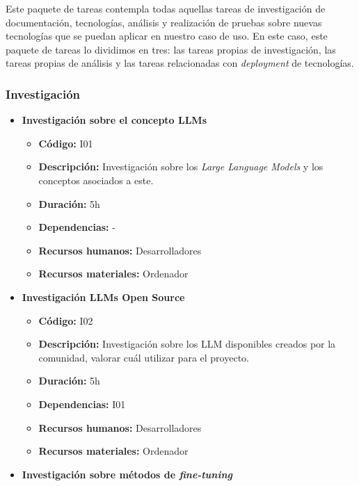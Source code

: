 
Este paquete de tareas contempla todas aquellas tareas de investigación de documentación, tecnologías, análisis y realización de pruebas sobre nuevas tecnologías
que se puedan aplicar en nuestro caso de uso. En este caso, este paquete de tareas lo dividimos en tres: las tareas propias de investigación, las tareas propias de
análisis y las tareas relacionadas con \textit{deployment} de tecnologías.

\subsubsection{Investigación}
\label{subsubsec:tareas_investigacion}


\begin{itemize}
    \item \textbf{Investigación sobre el concepto LLMs}
        \begin{itemize}
            \item \textbf{Código:} I01
            \item \textbf{Descripción:} Investigación sobre los \textit{Large Language Models} y los conceptos asociados a este.
            \item \textbf{Duración:} 5h
            \item \textbf{Dependencias:} -
            \item \textbf{Recursos humanos:} Desarrolladores
            \item \textbf{Recursos materiales:} Ordenador
        \end{itemize}
    \item \textbf{Investigación LLMs Open Source}
        \begin{itemize}
            \item \textbf{Código:} I02
            \item \textbf{Descripción:} Investigación sobre los LLM disponibles creados por la comunidad, valorar cuál utilizar para el proyecto.
            \item \textbf{Duración:} 5h
            \item \textbf{Dependencias:} I01
            \item \textbf{Recursos humanos:} Desarrolladores
            \item \textbf{Recursos materiales:} Ordenador
        \end{itemize}
    \item \textbf{Investigación sobre métodos de \textit{fine-tuning}}

\end{itemize}
